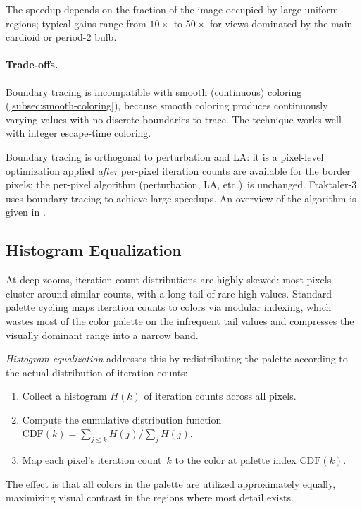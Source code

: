 The speedup depends on the fraction of the image occupied by large
uniform regions; typical gains range from $10\times$ to $50\times$ for
views dominated by the main cardioid or period-2 bulb.

\paragraph{Trade-offs.}
Boundary tracing is incompatible with smooth (continuous) coloring
(\cref{subsec:smooth-coloring}), because smooth coloring produces
continuously varying values with no discrete boundaries to trace.  The
technique works well with integer escape-time coloring.

Boundary tracing is orthogonal to perturbation and LA: it is a
pixel-level optimization applied \emph{after} per-pixel iteration counts
are available for the border pixels; the per-pixel algorithm
(perturbation, LA, etc.)\ is unchanged.  Fraktaler-3
uses boundary tracing to achieve large speedups.  An overview of the
algorithm is given in \cite{WikipediaPlottingAlgorithms}.

\subsection{Histogram Equalization}
\label{subsec:histogram-equalization}

At deep zooms, iteration count distributions are highly skewed: most
pixels cluster around similar counts, with a long tail of rare high
values.  Standard palette cycling maps iteration counts to colors via
modular indexing, which wastes most of the color palette on the
infrequent tail values and compresses the visually dominant range into a
narrow band.

\emph{Histogram equalization} addresses this by redistributing the
palette according to the actual distribution of iteration counts:
\begin{enumerate}
  \item Collect a histogram $H(k)$ of iteration counts across all
        pixels.
  \item Compute the cumulative distribution function
        $\mathrm{CDF}(k) = \sum_{j \le k} H(j) \big/ \sum_j H(j)$.
  \item Map each pixel's iteration count~$k$ to the color at palette
        index $\mathrm{CDF}(k)$.
\end{enumerate}
The effect is that all colors in the palette are utilized approximately
equally, maximizing visual contrast in the regions where most detail
exists.

